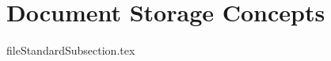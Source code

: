 \documentclass[class=book , crop=false]{standalone}
\begin{document}
	\section{Document Storage Concepts}

		{fileStandardSubsection.tex}
		
\end{document}
